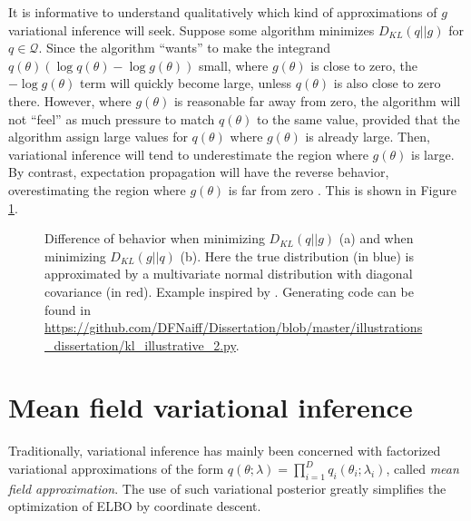 It is informative to understand qualitatively which kind of approximations of $g$ variational inference will seek. Suppose some algorithm minimizes $D_{KL}(q || g)$ for $q \in \mathcal{Q}$. Since the algorithm \enquote{wants} to make the integrand $q(\theta) (\log q(\theta) - \log g(\theta))$ small, where $g(\theta)$ is close to zero, the $-\log g(\theta)$ term will quickly become large, unless $q(\theta)$ is also close to zero there. However, where $g(\theta)$ is reasonable far away from zero, the algorithm will not \enquote{feel} as much pressure to match $q(\theta)$ to the same value, provided that the algorithm assign large values for $q(\theta)$ where $g(\theta)$ is already large. Then, variational inference will tend to underestimate the region where $g(\theta)$ is large. By contrast, expectation propagation will have the reverse behavior, overestimating the region where $g(\theta)$ is far from zero \cite{Bishop_2007}. This is shown in Figure \ref{vixepfigure}.

\begin{figure}
	\centering


	\caption[Difference of behavior when minimizing $D_{KL}(q||g)$ and $D_{KL}(g||q)$]{\label{vixepfigure} Difference of behavior when minimizing $D_{KL}(q||g)$ (a) and when minimizing $D_{KL}(g||q)$ (b). Here the true distribution (in blue) is approximated by a multivariate normal distribution with diagonal covariance (in red). Example inspired by \cite{Bishop_2007}. Generating code can be found in \url{https://github.com/DFNaiff/Dissertation/blob/master/illustrations_dissertation/kl_illustrative_2.py}.}
\end{figure}

\section{Mean field variational inference}
Traditionally, variational inference has mainly been concerned with factorized variational approximations of the form $q(\theta;\lambda) = \prod_{i=1}^D q_i(\theta_i;\lambda_i)$, called \textit{mean field approximation}. The use of such variational posterior greatly simplifies the optimization of ELBO by coordinate descent. 

